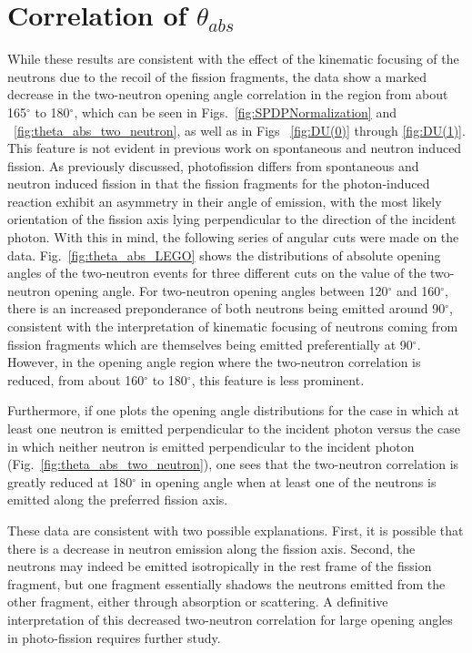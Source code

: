 \section{Correlation of $\theta_{abs}$}
While these results are consistent with the effect of the kinematic focusing of the neutrons due to the recoil of the fission fragments, the data show a marked decrease in the two-neutron opening angle correlation in the region from about 165$^{\circ}$ to 180$^{\circ}$, which can be seen in Figs.~\ref{fig:SPDPNormalization} and ~\ref{fig:theta_abs_two_neutron}, as well as in Figs ~\ref{fig:DU(0)} through \ref{fig:DU(1)}.
This feature is not evident in previous work on spontaneous and neutron induced fission.
As previously discussed, photofission differs from spontaneous and neutron induced fission in that the fission fragments for the photon-induced reaction exhibit an asymmetry in their angle of emission, with the most likely orientation of the fission axis lying perpendicular to the direction of the incident photon.
With this in mind, the following series of angular cuts were made on the data.
Fig.~\ref{fig:theta_abs_LEGO} shows the distributions of absolute opening angles of the two-neutron events for three different cuts on the value of the two-neutron opening angle.
For two-neutron opening angles between 120$^{\circ}$ and 160$^{\circ}$, there is an increased preponderance of both neutrons being emitted around 90$^{\circ}$, consistent with the interpretation of kinematic focusing of neutrons coming from fission fragments which are themselves being emitted preferentially at 90$^{\circ}$.
However, in the opening angle region where the two-neutron correlation is reduced, from about 160$^{\circ}$ to 180$^{\circ}$, this feature is less prominent.

Furthermore, if one plots the opening angle distributions for the case in which at least one neutron is emitted perpendicular to the incident photon versus the case in which neither neutron is emitted perpendicular to the incident photon (Fig.~\ref{fig:theta_abs_two_neutron}), one sees that the two-neutron correlation is greatly reduced at 180$^{\circ}$ in opening angle when at least one of the neutrons is emitted along the preferred fission axis.

These data are consistent with two possible explanations.
First, it is possible that there is a decrease in neutron emission along the fission axis.
Second, the neutrons may indeed be emitted isotropically in the rest frame of the fission fragment, but one fragment essentially shadows the neutrons emitted from the other fragment, either through absorption or scattering.
A definitive interpretation of this decreased two-neutron correlation for large opening angles in photo-fission requires further study.

